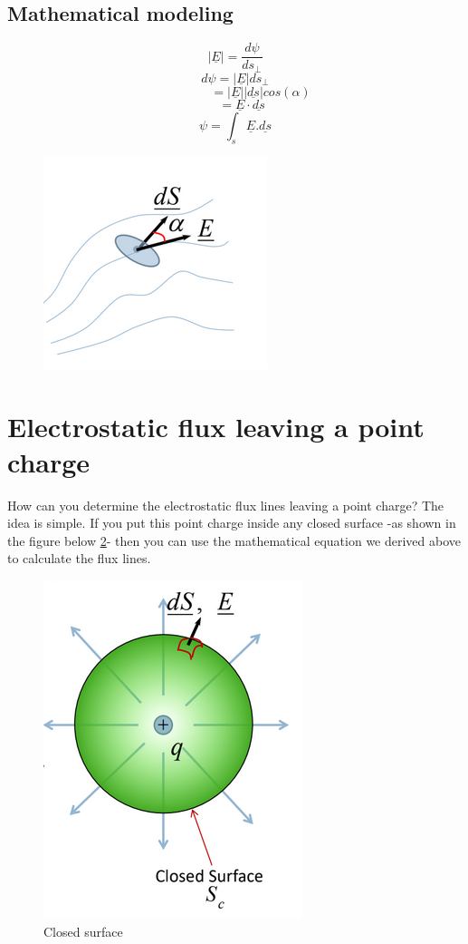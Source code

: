 \documentclass[12 pt]{article}
\begin{document}
\subsection{Mathematical modeling}
\begin{minipage}{0.35\linewidth}
$$
|\underline{E}|=\frac{d\psi}{ds_{\perp}}
$$
$$
d\psi=|\underline{E}| ds_{\perp}
$$
$$
\quad \quad \quad \quad=|\underline{E}| |\underline{ds}| cos(\alpha)
$$
$$
\quad = \underline{E} \cdot \underline{ds}
$$
$$
\boxed{\psi= \int_s \underline{E}.\underline{ds}}
$$
\end{minipage}
\begin{minipage}{0.6\linewidth}
    \begin{figure}[H]
        \centering
        \includegraphics[scale=0.5]{./images/flux1}
        \label{flux1} 
    \end{figure}
\end{minipage}
\section{Electrostatic flux leaving a point charge}
How can you determine the electrostatic flux lines leaving a point charge? The idea is simple. If you put this point charge inside any closed surface -as shown in the figure below \ref{closed}- then you can use the mathematical equation we derived above to calculate the flux lines.
    \begin{figure}[H]
        \centering
        \includegraphics[scale=0.5]{./images/closed}
        \caption{Closed surface}
        \label{closed} 
    \end{figure}
\end{document}
